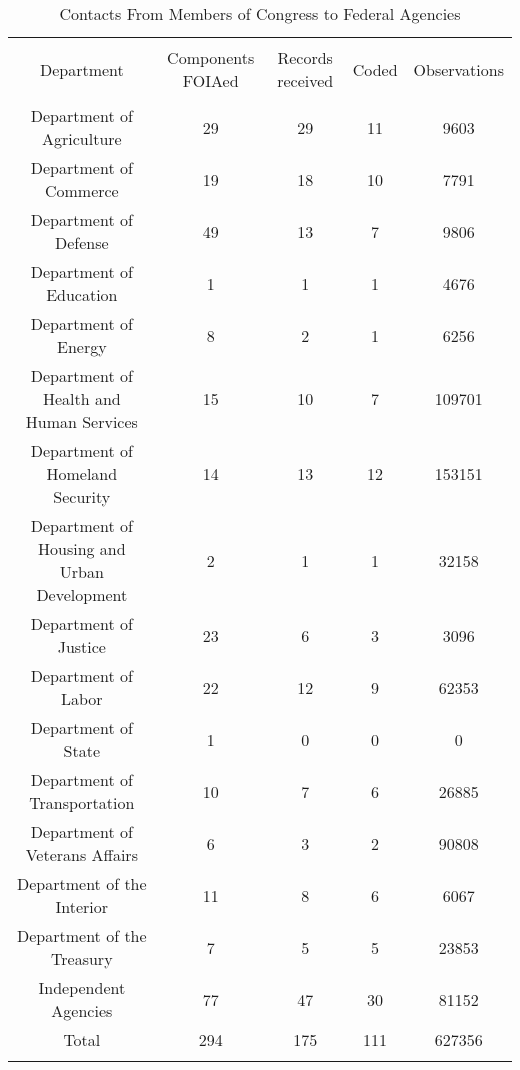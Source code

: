 
\begin{table}[!htbp] \centering 
  \caption{Contacts From Members of Congress to Federal Agencies} 
  \label{responserates} 
\begin{tabular}{@{\extracolsep{5pt}} ccccc} 
\\[-1.8ex]\hline \\[-1.8ex] 
Department & Components FOIAed & Records received & Coded & Observations \\ 
\hline \\[-1.8ex] 
Department of Agriculture & 29 & 29 & 11 & 9603 \\ 
Department of Commerce & 19 & 18 & 10 & 7791 \\ 
Department of Defense & 49 & 13 & 7 & 9806 \\ 
Department of Education & 1 & 1 & 1 & 4676 \\ 
Department of Energy & 8 & 2 & 1 & 6256 \\ 
Department of Health and Human Services & 15 & 10 & 7 & 109701 \\ 
Department of Homeland Security & 14 & 13 & 12 & 153151 \\ 
Department of Housing and Urban Development & 2 & 1 & 1 & 32158 \\ 
Department of Justice & 23 & 6 & 3 & 3096 \\ 
Department of Labor & 22 & 12 & 9 & 62353 \\ 
Department of State & 1 & 0 & 0 & 0 \\ 
Department of Transportation & 10 & 7 & 6 & 26885 \\ 
Department of Veterans Affairs & 6 & 3 & 2 & 90808 \\ 
Department of the Interior & 11 & 8 & 6 & 6067 \\ 
Department of the Treasury & 7 & 5 & 5 & 23853 \\ 
Independent Agencies & 77 & 47 & 30 & 81152 \\ 
Total & 294 & 175 & 111 & 627356 \\ 
\hline \\[-1.8ex] 
\end{tabular} 
\end{table} 
